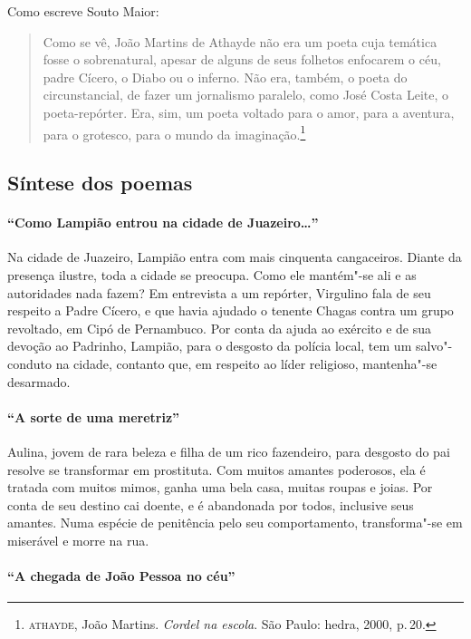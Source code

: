 Como escreve Souto Maior:

\begin{quote}
Como se vê, João Martins de Athayde não era um poeta
cuja temática fosse o sobrenatural, apesar de alguns de seus
folhetos enfocarem o céu, padre Cícero, o Diabo ou o
inferno. Não era, também, o poeta do circunstancial, de
fazer um jornalismo paralelo, como José Costa Leite, o
poeta-repórter. Era, sim, um poeta voltado para o amor,
para a aventura, para o grotesco, para o mundo da
imaginação.\footnote{\textsc{athayde}, João Martins. \textit{Cordel na escola}. São Paulo: hedra, 2000, p.\,20.}
\end{quote}

\subsection{Síntese dos poemas}

\paragraph{``Como Lampião entrou na cidade de
Juazeiro\ldots''}

Na cidade de Juazeiro, Lampião entra com mais cinquenta cangaceiros. Diante da
presença ilustre, toda a cidade se preocupa. Como ele mantém"-se ali e as
autoridades nada fazem? Em entrevista a um repórter, Virgulino fala de
seu respeito a Padre Cícero, e que havia ajudado o tenente Chagas
contra um grupo revoltado, em Cipó de Pernambuco. Por conta da ajuda ao
exército e de sua devoção ao Padrinho, Lampião, para o desgosto da
polícia local, tem um salvo"-conduto na cidade, contanto que, em respeito
ao líder religioso, mantenha"-se desarmado. 

\paragraph{``A sorte de uma meretriz''}

Aulina, jovem de rara beleza e filha de um rico fazendeiro, para
desgosto do pai resolve se transformar em prostituta. Com muitos
amantes poderosos, ela é tratada com muitos mimos, ganha uma bela casa,
muitas roupas e joias. Por conta de seu destino cai doente, e é
abandonada por todos, inclusive seus amantes. Numa espécie de
penitência pelo seu comportamento, transforma"-se em miserável e morre
na rua. 

\paragraph{``A chegada de João Pessoa no céu''}

